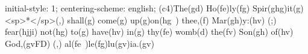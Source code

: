 initial-style: 1;
centering-scheme: english;
(c4)The(gd) Ho(fe)ly(fg) Spir(ghg)it(g) <sp>*</sp>(,) shall(g) come(g) up(g)on(hg~) thee,(f) Mar(gh)y:(hv) (;) fear(hjji) not(hg) to(g) have(hv) in(g) thy(fe) womb(d) the(fv) Son(gh) of(hv) God,(gvFD) (,) al(fe~)le(fg)lu(gv)ia.(gv)
